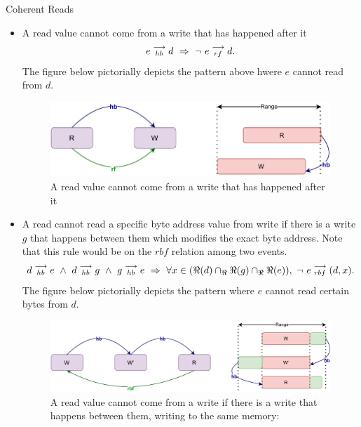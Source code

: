 \begin{axiom}{Coherent Reads}
            \begin{itemize}
                \item A read value cannot come from a write that has happened after it 
                    \begin{align*}
                        \reln{e}{hb}{d}\ \Rightarrow{}\ \neg \ \reln{e}{rf}{d}.
                    \end{align*}
                    The figure below pictorially depicts the pattern above hwere $e$ cannot read from $d$.
                    \begin{figure}[H]
                        \centering
                        \includegraphics[scale=0.7]{4.ECMAScriptMemoryModel/CoherentReads1.pdf}
                        \caption{A read value cannot come from a write that has happened after it}
                    \end{figure}
                \item A read cannot read a specific byte address value from write if there is a write $g$ that happens between them which modifies the exact byte address. Note that this rule would be on the $rbf$ relation among two events. 
                    \begin{align*}
                        \reln{d}{hb}{e}
                        \ \wedge \ 
                        \reln{d}{hb}{g} \ \wedge \  \reln{g}{hb}{e}
                        \ \Rightarrow{} \
                        \forall x \in (\Re(d) \cap_\Re \Re(g) \cap_\Re \Re(e)), \ \neg \ \reln{e}{rbf}{(d,x)}.
                    \end{align*}
                    The figure below pictorially depicts the pattern where $e$ cannot read certain bytes from $d$. 
                    \begin{figure}[H]
                        \centering 
                        \includegraphics[scale=0.7]{4.ECMAScriptMemoryModel/CoherentReads2.pdf}
                        \caption{A read value cannot come from a write if
                        there is a write that happens between them, writing to the same memory:}
                    \end{figure}
                            
            \end{itemize}
        \end{axiom}
